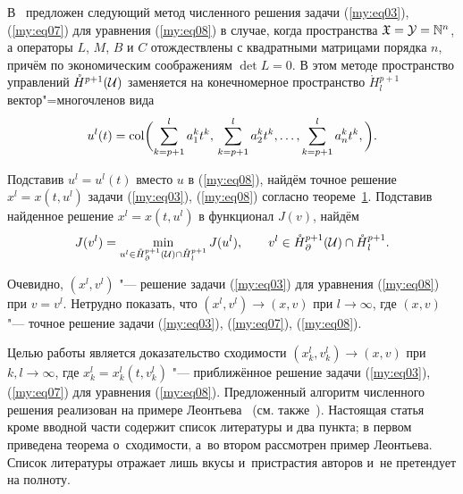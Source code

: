  В~\cite{Bur} предложен следующий метод численного решения задачи (\ref{my:eq03}), (\ref{my:eq07}) для уравнения (\ref{my:eq08}) в случае,
 когда пространства  ${\mathfrak X}={\cal Y}={\mathbb N}^{n}$, а операторы $L$, $M$, $B$ и $C$ отождествлены с квадратными матрицами
 порядка $n$, причём по экономическим соображениям $\det L=0$. В этом методе пространство управлений
 $\mathring{H}{}^{p+1} ({\cal U})$ заменяется на конечномерное пространство
 $\mathring{H}{}^{p+1}_{l}$ вектор"=многочленов вида
 \begin{equation*}
u^{l} (t) = {\rm col} \biggl( \sum\limits^{l}_{k=p+1} a^{k}_{1} t^{k}, \, \sum\limits^{l}_{k=p+1} a^{k}_{2} t^{k}, \dots,
 \sum\limits^{l}_{k=p+1} a^{k}_{n} t^{k}, \biggr).
 \end{equation*}

 Подставив $u^{l}=u^{l}(t)$ вместо $u$ в (\ref{my:eq08}), найдём точное решение $x^{l}=x(t,u^{l})$ задачи (\ref{my:eq03}), (\ref{my:eq08}) согласно
 теореме~\hyperlink{svir:th:1}{1}. Подставив найденное решение $x^{l}=x(t,u^{l})$ в функционал $J(v)$, найдём
 \begin{equation*}
J(v^{l})=\min\limits_{u^{l}\in\mathring{H}{}^{p+1}_{\partial}({\cal U})\cap\mathring{H}{}^{p+1}_{l}}J(u^{l}),
\qquad v^{l}\in\mathring{H}{}^{p+1}_{\partial}({\cal U}) \cap \mathring{H}{}^{p+1}_{l}.
\end{equation*}



Очевидно, $(x^{l},v^{l})$ "--- решение задачи (\ref{my:eq03}) для уравнения (\ref{my:eq08}) при $v=v^{l}$. Нетрудно показать, что
$(x^{l}, v^{l}) \rightarrow (x,v)$ при $l\rightarrow\infty$, где $(x,v)$ "--- точное решение задачи (\ref{my:eq03}), (\ref{my:eq07}), (\ref{my:eq08}).

Целью работы является доказательство сходимости $(x^{l}_{k}, v^{l}_{k})\rightarrow (x,v)$ при
$k,l \rightarrow\infty$, где $x^{l}_{k}=x^{l}_{k} (t, v^{l}_{k})$  "--- приближённое решение задачи (\ref{my:eq03}), (\ref{my:eq07}) для уравнения (\ref{my:eq08}). 
Предложенный алгоритм численного решения реализован на примере Леонтьева~\cite[гл.~1]{Leo} (см. также~\cite{SvirBr, SvirBur}).
Настоящая статья кроме вводной части содержит список литературы и два пункта; в первом приведена теорема о~сходимости, а~во
втором рассмотрен пример Леонтьева.
Список литературы отражает лишь вкусы и~пристрастия авторов и~не претендует на полноту.

\smallskip

